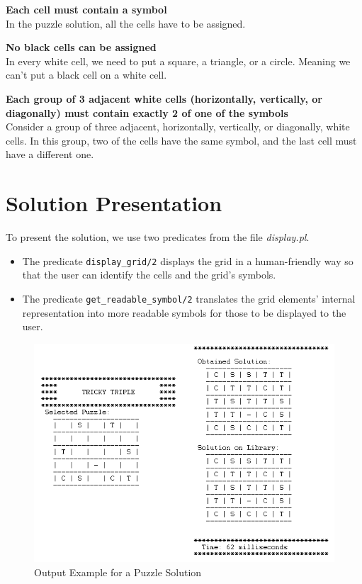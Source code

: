 \documentclass[runningheads]{llncs}
\begin{document}
\textbf{Each cell must contain a symbol} \\
In the puzzle solution, all the cells have to be assigned.

\textbf{No black cells can be assigned} \\
In every white cell, we need to put a square, a triangle, or a circle.
Meaning we can't put a black cell on a white cell.

\textbf{Each group of 3 adjacent white cells (horizontally, vertically, or diagonally)
    must contain exactly 2 of one of the symbols} \\
Consider a group of three adjacent, horizontally, vertically, or diagonally, white cells.
In this group, two of the cells have the same symbol, and the last cell must have a different one.

\section{Solution Presentation}
To present the solution, we use two predicates from the file \textit{display.pl}.
\begin{itemize}
    \item The predicate \verb|display_grid/2| displays the grid in a human-friendly way so that
        the user can identify the cells and the grid's symbols.
    \item The predicate \verb|get_readable_symbol/2| translates the grid elements' internal representation
        into more readable symbols for those to be displayed to the user.
\end{itemize}

\begin{figure} [h]
    \centering
    \includegraphics[scale=0.6]{img/puzzle_solving.png}
    \caption{Output Example for a Puzzle Solution} \label{fig2}
\end{figure}
\end{document}
